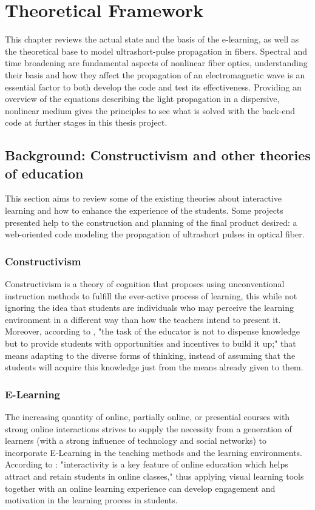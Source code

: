 \chapter{Theoretical Framework}

This chapter reviews the actual state and the basis of the e-learning, as well as the theoretical base to model ultrashort-pulse propagation in fibers. Spectral and time broadening are fundamental aspects of nonlinear fiber optics, understanding their basis and how they affect the propagation of an electromagnetic wave is an essential factor to both develop the code and test its effectiveness. Providing an overview of the equations describing the light propagation in a dispersive, nonlinear medium gives the principles to see what is solved with the back-end code at further stages in this thesis project.




\section{Background: Constructivism and other theories of education}
This section aims to review some of the existing theories about interactive learning and how to enhance the experience of the students. Some projects presented help to the construction and planning of the final product desired: a web-oriented code modeling the propagation of ultrashort pulses in optical fiber.



\subsection{Constructivism}
Constructivism is a theory of cognition that proposes using unconventional instruction methods to fulfill the ever-active process of learning, this while not ignoring the idea that students are individuals who may perceive the learning environment in a different way than how the teachers intend to present it. Moreover, according to \cite{fosnot2013constructivism}, "the task of the educator is not to dispense knowledge but to provide students with opportunities and incentives to build it up;" that means adapting to the diverse forms of thinking, instead of assuming that the students will acquire this knowledge just from the means already given to them.


\subsection{E-Learning}
The increasing quantity of online, partially online, or presential courses with strong online interactions strives to supply the necessity from a generation of learners (with a strong influence of technology and social networks) to incorporate E-Learning in the teaching methods and the learning environments.  According to \cite{vltool}: "interactivity is a key feature of online education which helps attract and retain students in online classes," thus applying visual learning tools together with an online learning experience can develop engagement and motivation in the learning process in students. 

